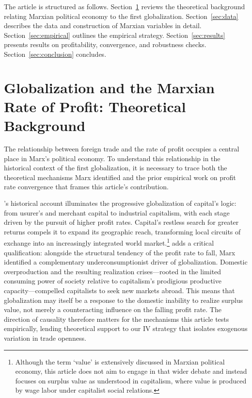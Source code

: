 \documentclass[10pt]{article}
\begin{document}
\par The article is structured as follows. Section~\ref{sec:theory} reviews the theoretical background relating Marxian political economy to the first globalization. Section~\ref{sec:data} describes the data and construction of Marxian variables in detail. Section~\ref{sec:empirical} outlines the empirical strategy. Section~\ref{sec:results} presents results on profitability, convergence, and robustness checks. Section~\ref{sec:conclusion} concludes.

\section{Globalization and the Marxian Rate of Profit: Theoretical Background}
\label{sec:theory}

The relationship between foreign trade and the rate of profit occupies a central place in Marx's political economy. To understand this relationship in the historical context of the first globalization, it is necessary to trace both the theoretical mechanisms Marx identified and the prior empirical work on profit rate convergence that frames this article's contribution.

\par \citet{mandel1962marxist}'s historical account illuminates the progressive globalization of capital's logic: from usurer's and merchant capital to industrial capitalism, with each stage driven by the pursuit of higher profit rates. Capital's restless search for greater returns compels it to expand its geographic reach, transforming local circuits of exchange into an increasingly integrated world market.\footnote{Although the term `value' is extensively discussed in Marxian political economy, this article does not aim to engage in that wider debate and instead focuses on surplus value as understood in capitalism, where value is produced by wage labor under capitalist social relations.} \citet{ramirez2012falling} adds a critical qualification: alongside the structural tendency of the profit rate to fall, Marx identified a complementary underconsumptionist driver of globalization. Domestic overproduction and the resulting realization crises---rooted in the limited consuming power of society relative to capitalism's prodigious productive capacity---compelled capitalists to seek new markets abroad. This means that globalization may itself be a response to the domestic inability to realize surplus value, not merely a counteracting influence on the falling profit rate. The direction of causality therefore matters for the mechanisms this article tests empirically, lending theoretical support to our IV strategy that isolates exogenous variation in trade openness.
\end{document}
